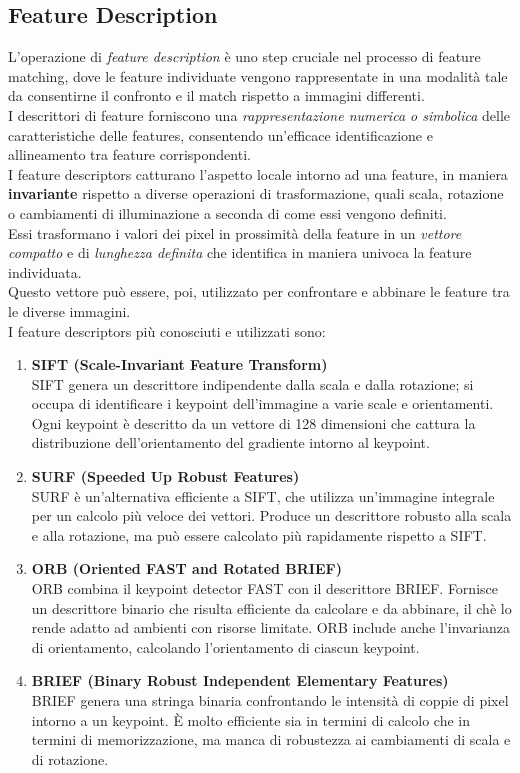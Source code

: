 \documentclass[12pt,a4paper,openright,twoside]{book}
\begin{document}
\subsection{Feature Description}
L'operazione di {\itshape feature description} è uno step cruciale nel processo di feature matching, dove le feature individuate vengono rappresentate in una modalità tale da consentirne il confronto e il match rispetto a immagini differenti.\\
I descrittori di feature forniscono una {\itshape rappresentazione numerica o simbolica} delle caratteristiche delle features, consentendo un'efficace identificazione e allineamento tra feature corrispondenti.\\
I feature descriptors catturano l'aspetto locale intorno ad una feature, in maniera \textbf{invariante} rispetto a diverse operazioni di trasformazione, quali scala, rotazione o cambiamenti di illuminazione a seconda di come essi vengono definiti.\\
Essi trasformano i valori dei pixel in prossimità della feature in un {\itshape vettore compatto} e di {\itshape lunghezza definita} che identifica in maniera univoca la feature individuata.\\
Questo vettore può essere, poi, utilizzato per confrontare e abbinare le feature tra le diverse immagini.\\
I feature descriptors più conosciuti e utilizzati sono:
\begin{enumerate}

\item \textbf{SIFT (Scale-Invariant Feature Transform)}\\
SIFT genera un descrittore indipendente dalla scala e dalla rotazione; si occupa di identificare i keypoint dell'immagine a varie scale e orientamenti. Ogni keypoint è descritto da un vettore di 128 dimensioni che cattura la distribuzione dell'orientamento del gradiente intorno al keypoint.

\item \textbf{SURF (Speeded Up Robust Features)}\\
SURF è un'alternativa efficiente a SIFT, che utilizza un'immagine integrale per un calcolo più veloce dei vettori. Produce un descrittore robusto alla scala e alla rotazione, ma può essere calcolato più rapidamente rispetto a SIFT.

\item \textbf{ORB (Oriented FAST and Rotated BRIEF)}\\
ORB combina il keypoint detector FAST con il descrittore BRIEF. Fornisce un descrittore binario che risulta efficiente da calcolare e da abbinare, il chè lo rende adatto ad ambienti con risorse limitate. ORB include anche l'invarianza di orientamento, calcolando l'orientamento di ciascun keypoint.

\item \textbf{BRIEF (Binary Robust Independent Elementary Features)}\\
BRIEF genera una stringa binaria confrontando le intensità di coppie di pixel intorno a un keypoint. È molto efficiente sia in termini di calcolo che in termini di memorizzazione, ma manca di robustezza ai cambiamenti di scala e di rotazione.
\end{enumerate}
\end{document}
